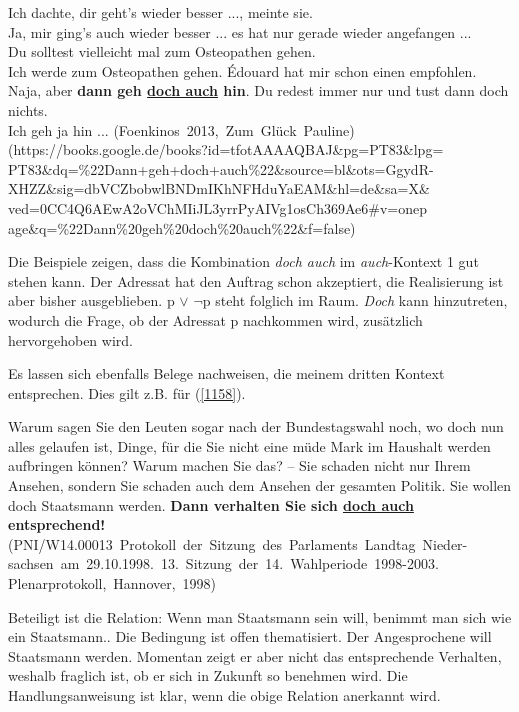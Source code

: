 {\begin{exe}
	\ex\label{1156} 
	\scriptsize
	\glqq Ich dachte, dir geht's wieder besser ...\grqq{}, meinte sie.\\
	\glqq Ja, mir ging's auch wieder besser ... es hat nur gerade wieder angefangen ...\grqq{}\\
	\glqq Du solltest vielleicht mal zum Osteopathen gehen.\grqq{}\\
	\glqq Ich werde zum Osteopathen gehen. Édouard hat mir schon einen empfohlen.\grqq{}\\
	\glqq Naja, aber \textbf{dann geh \underline{doch auch} hin}. Du redest immer nur und tust dann doch nichts.\grqq{}\\	
	\glqq Ich geh ja hin ...\grqq{}
	\hfill\hbox{(Foenkinos 2013, Zum Glück Pauline)}
	\newline
	\hbox{}\hfill\hbox{(https://books.google.de/books?id=tfotAAAAQBAJ\&pg=PT83\&lpg=}
	\newline
	\hbox{}\hfill\hbox{PT83\&dq=\%22Dann+geh+doch+auch\%22\&source=bl\&ots=GgydR-}
	\newline
	\hbox{}\hfill\hbox{XHZZ\&sig=dbVCZbobwlBNDmIKhNFHduYaEAM\&hl=de\&sa=X\&}
	\newline
	\hbox{}\hfill\hbox{ved=0CC4Q6AEwA2oVChMIiJL3yrrPyAIVg1osCh369Ae6\#v=onep}
	\newline
	\hbox{}\hfill\hbox{age\&q=\%22Dann\%20geh\%20doch\%20auch\%22\&f=false)}
\end{exe}
Die Beispiele zeigen, dass die Kombination \textit{doch auch} im \textit{auch}-Kontext 1 gut stehen kann. Der Adressat hat den Auftrag schon akzeptiert, die Realisierung ist aber bisher ausgeblieben. p $\vee$ $\neg$p steht folglich im Raum. \textit{Doch} kann hinzutreten, wodurch die Frage, ob der Adressat p nachkommen wird, zusätzlich hervorgehoben wird.

Es lassen sich ebenfalls Belege nachweisen, die meinem dritten Kontext entspre\-chen. Dies gilt z.B. für (\ref{1158}).

\begin{exe}
	\ex\label{1158} 
	\scriptsize
	Warum sagen Sie den Leuten sogar nach der Bundestagswahl noch, wo doch nun alles gelaufen ist, Dinge, für die Sie nicht eine müde Mark im Haushalt 			werden aufbringen können? Warum machen Sie das? – Sie schaden nicht nur Ihrem Ansehen, sondern Sie schaden auch dem Ansehen der gesamten Politik. Sie 		wollen doch Staatsmann werden. \textbf{Dann verhalten Sie sich \underline{doch auch} entsprechend!} 
	\newline
	\hbox{}\hfill\hbox{(PNI/W14.00013 Protokoll der Sitzung des Parlaments Landtag Nieder-}
	\newline
	\hbox{}\hfill\hbox{sachsen am 29.10.1998. 13. Sitzung der 14. Wahlperiode 1998-2003.}
	\newline
	\hbox{}\hfill\hbox{Plenarprotokoll, Hannover, 1998)}
\end{exe}
Beteiligt ist die Relation: \glq Wenn man Staatsmann sein will, benimmt man sich wie ein Staatsmann.\grq {}. Die Bedingung ist offen thematisiert. Der Angespro\-chene will Staatsmann werden. Momentan zeigt er aber nicht das entsprechende Verhalten, weshalb fraglich ist, ob er sich in Zukunft so benehmen wird. Die Handlungsanweisung ist klar, wenn die obige Relation anerkannt wird.

}
